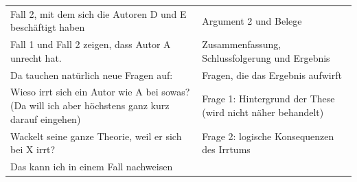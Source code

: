 \documentclass[]{book}
\theoremstyle{definition}
\theoremstyle{definition}
\theoremstyle{definition}
\theoremstyle{remark}
\begin{document}
\begin{longtable}[]{@{}ll@{}}
\begin{minipage}[t]{0.51\columnwidth}
Fall 2, mit dem sich die Autoren D und E beschäftigt haben\strut
\end{minipage} & \begin{minipage}[t]{0.43\columnwidth}\raggedright\strut
Argument 2 und Belege\vspace{-6mm}\strut
\end{minipage}\tabularnewline
\begin{minipage}[t]{0.51\columnwidth}\raggedright\strut
Fall 1 und Fall 2 zeigen, dass Autor A unrecht hat.\strut
\end{minipage} & \begin{minipage}[t]{0.43\columnwidth}\raggedright\strut
Zusammenfassung, Schlussfolgerung und Ergebnis\vspace{-6mm}\strut
\end{minipage}\tabularnewline
\begin{minipage}[t]{0.51\columnwidth}\raggedright\strut
Da tauchen natürlich neue Fragen auf:\strut
\end{minipage} & \begin{minipage}[t]{0.43\columnwidth}\raggedright\strut
Fragen, die das Ergebnis aufwirft\vspace{-6mm}\strut
\end{minipage}\tabularnewline
\begin{minipage}[t]{0.51\columnwidth}\raggedright\strut
Wieso irrt sich ein Autor wie A bei sowas? (Da will ich aber höchstens
ganz kurz darauf eingehen)\strut
\end{minipage} & \begin{minipage}[t]{0.43\columnwidth}\raggedright\strut
Frage 1: Hintergrund der These (wird nicht näher
behandelt)\vspace{-6mm}\strut
\end{minipage}\tabularnewline
\begin{minipage}[t]{0.51\columnwidth}\raggedright\strut
Wackelt seine ganze Theorie, weil er sich bei X irrt?\strut
\end{minipage} & \begin{minipage}[t]{0.43\columnwidth}\raggedright\strut
Frage 2: logische Konsequenzen des Irrtums \vspace{-6mm}\strut
\end{minipage}\tabularnewline
\begin{minipage}[t]{0.51\columnwidth}\raggedright\strut
Das kann ich in einem Fall nachweisen\strut
\end{minipage} & \begin{minipage}[t]{0.43\columnwidth}\raggedright\strut

\end{minipage}
\end{longtable}
\end{document}
